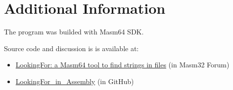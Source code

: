 \documentclass[11pt,a4paper]{scrartcl}
\begin{document}
\section{Additional Information}

	The program was builded with Masm64 SDK.
	
	Source code and discussion is is available at:
    \begin{itemize}
	
	\item \href{https://masm32.com/board/index.php?topic=11888.0}{LookingFor: a Masm64 tool to find strings in files} (in Masm32 Forum) 
	\item \href{https://github.com/ASMHSE/LookingFor-in-Assembly}{LookingFor\_in\_Assembly} (in GitHub) 
     \end{itemize}
	

\thispagestyle{empty}
\end{document}
